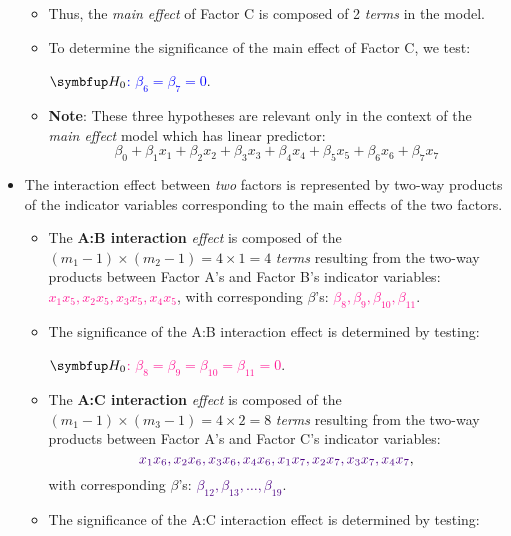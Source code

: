 \begin{itemize}
\begin{itemize}
                  \item Thus, the \emph{main effect} of Factor C is composed of 2 \emph{terms} in the model.
                  \item To determine the significance of the main effect of Factor C, we test:
                        \begin{tightcenter}
                              \textcolor{Blue}{$\HN$: $\beta_6=\beta_7=0$}.
                        \end{tightcenter}
                  \item \textbf{Note}: These three hypotheses are relevant only in the context of the \emph{main effect} model which has linear predictor:
                        \[ \beta_0+\beta_1x_1+\beta_2x_2+\beta_3x_3+\beta_4x_4+\beta_5x_5+\beta_6x_6+\beta_7x_7 \]
            \end{itemize}
      \item The interaction effect between \emph{two} factors is represented by two-way products of the indicator variables
            corresponding to the main effects of the two factors.
            \begin{itemize}
                  \item The \textbf{A:B interaction} \emph{effect} is composed of the $ (m_1-1)\times (m_2-1)=4\times 1=4 $ \emph{terms}
                        resulting from the two-way products between Factor A's and Factor B's indicator variables: \textcolor{DeepPink}{$ x_1x_5,x_2x_5,x_3x_5,x_4x_5 $},
                        with corresponding $ \beta $'s: \textcolor{DeepPink}{$ \beta_8,\beta_9,\beta_{10},\beta_{11} $}.
                  \item The significance of the A:B interaction effect is determined by testing:
                        \begin{tightcenter}
                              \textcolor{DeepPink}{$ \HN $: $ \beta_8=\beta_9=\beta_{10}=\beta_{11}=0 $}.
                        \end{tightcenter}
                  \item The \textbf{A:C interaction} \emph{effect} is composed of the $ (m_1-1)\times (m_3-1)=4\times 2=8 $ \emph{terms}
                        resulting from the two-way products between Factor A's and Factor C's indicator variables:
                        \[ \textcolor{Indigo}{x_1x_6,x_2x_6,x_3x_6,x_4x_6,x_1x_7,x_2x_7,x_3x_7,x_4x_7}, \]
                        with corresponding $ \beta $'s: \textcolor{Indigo}{$ \beta_{12},\beta_{13},\ldots,\beta_{19} $}.
                  \item The significance of the A:C interaction effect is determined by testing:

\end{itemize}
\end{itemize}
